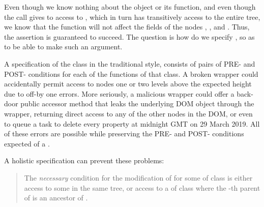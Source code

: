 Even though we know nothing about the  object or
its  function, and even though the call gives
to  access to , which in turn has transitively
access to the entire tree, we know that %
the  function will not
affect the  fields of the nodes , ,
and .  Thus, the assertion is guaranteed to
succeed.  The question is how do we specify , so as to be
able to make such an argument. %

A specification of the class  in the traditional
style, \cite{Leavens-etal07} 
consists of pairs of PRE- and POST- conditions for each of the
functions of that class. 
A broken
wrapper could accidentally permit access to nodes one or two levels
above the expected height due to off-by one errors. More seriously,
a malicious wrapper could offer a
back-door public accessor method that leaks the underlying DOM
object through the wrapper, returning direct access to any of the
other nodes in the DOM, or even to queue a task to
delete every property at midnight GMT on 29 March 2019. All of these errors are possible while
preserving the PRE- and POST- conditions expected of a . 

%
%
A holistic specification can prevent these problems:
%
\begin{quote}
The \emph{necessary} condition for the modification of  for some  of class   is either access to some    in the same tree, or  access to a  of class  where the -th parent of  is an ancestor of .
\end{quote}

